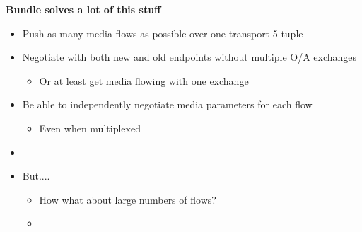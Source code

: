 \documentclass[helvetica]{seminar}
\newcommand{\heading}[1]{%
  \begin{center} 
    \large\bf 
    #1 
  \end{center} 
  \vspace{.4 in}}
\begin{document}
\begin{slide}
\heading{Bundle solves a lot of this stuff}

\begin{itemize}
\item Push as many media flows as possible over one transport 5-tuple
\item Negotiate with both new and old endpoints without multiple O/A exchanges
  \begin{itemize}
  \item Or at least get media flowing with one exchange
  \end{itemize}
\item Be able to independently negotiate media parameters for each flow
  \begin{itemize}
  \item Even when multiplexed
\end{itemize}
\item[]
\item But....
  \begin{itemize}
  \item How what about large numbers of flows?
  \item 
  \end{itemize}
\end{itemize}
\end{slide}
\end{document}
